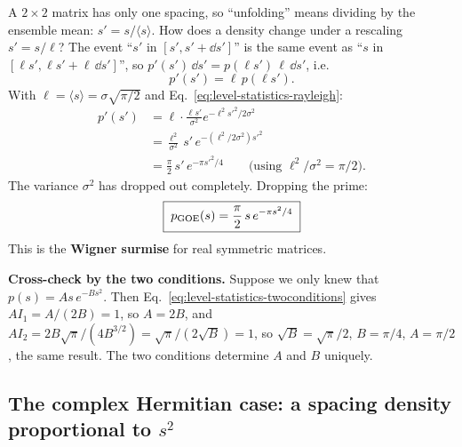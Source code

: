 A $2\times2$ matrix has only one spacing, so ``unfolding'' means dividing by the ensemble mean: $s'=s/\langle s\rangle$. How does a density change under a rescaling $s'=s/\ell$? The event ``$s'$ in $[s',s'+\dd s']$'' is the same event as ``$s$ in $[\ell s',\ell s'+\ell\,\dd s']$'', so $p'(s')\,\dd s'=p(\ell s')\,\ell\,\dd s'$, i.e.
\begin{equation}
p'(s')=\ell\,p(\ell s').
\label{eq:level-statistics-rescale}
\end{equation}
With $\ell=\langle s\rangle=\sigma\sqrt{\pi/2}$ and Eq.~\eqref{eq:level-statistics-rayleigh}:
\begin{align}
p'(s')&=\ell\cdot\frac{\ell s'}{\sigma^2}e^{-\ell^2s'^2/2\sigma^2}\nonumber\\
&=\frac{\ell^2}{\sigma^2}\,s'\,e^{-(\ell^2/2\sigma^2)s'^2}\nonumber\\
&=\frac{\pi}{2}\,s'\,e^{-\pi s'^2/4}\qquad\text{(using }\ell^2/\sigma^2=\pi/2).
\end{align}
The variance $\sigma^2$ has dropped out completely. Dropping the prime:
\begin{equation}
\boxed{\;p_{\rm GOE}(s)=\frac{\pi}{2}\,s\,e^{-\pi s^2/4}\;}
\label{eq:level-statistics-goe}
\end{equation}
This is the \textbf{Wigner surmise} for real symmetric matrices.

\textbf{Cross-check by the two conditions.} Suppose we only knew that $p(s)=As\,e^{-Bs^2}$. Then Eq.~\eqref{eq:level-statistics-twoconditions} gives $AI_1=A/(2B)=1$, so $A=2B$, and $AI_2=2B\sqrt\pi/(4B^{3/2})=\sqrt\pi/(2\sqrt B)=1$, so $\sqrt B=\sqrt\pi/2$, $B=\pi/4$, $A=\pi/2$, the same result. The two conditions determine $A$ and $B$ uniquely.

\subsection{The complex Hermitian case: a spacing density proportional to $s^2$}

